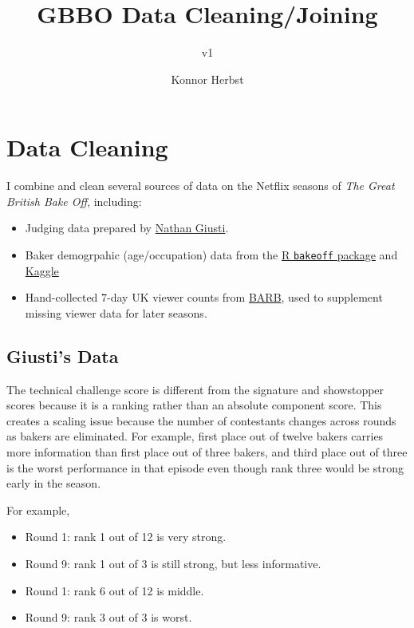 \documentclass[
  11pt,
  letterpaper,
  DIV=11,
  numbers=noendperiod]{scrartcl}
\title{GBBO Data Cleaning/Joining}
\subtitle{v1}
\author{Konnor Herbst}
\date{}
\renewcommand*\contentsname{Table of contents}
\newcommand\contentsname{Table of contents}
\begin{document}
\maketitle

\renewcommand*\contentsname{Table of contents}
{
\hypersetup{linkcolor=}
\setcounter{tocdepth}{7}
\tableofcontents
}

\newpage

\section{Data Cleaning}\label{data-cleaning}

I combine and clean several sources of data on the Netflix seasons of
\textit{The Great British Bake Off}, including:

\begin{itemize}
  \item Judging data prepared by \href{https://github.com/nathangiusti/BakeOff}{Nathan Giusti}.
  \item Baker demogrpahic (age/occupation) data from the
  \href{https://cran.r-project.org/web/packages/bakeoff/index.html}{R \texttt{bakeoff} package} and \href{https://www.kaggle.com/datasets/sarahvitvitskiy/great-british-bake-off-results-seasons-1-14}{Kaggle}
  \item Hand-collected 7-day UK viewer counts from
  \href{https://www.barb.co.uk/viewing-data/most-viewed-programmes/}{BARB},
  used to supplement missing viewer data for later seasons.
\end{itemize}

\subsection{Giusti's Data}\label{giustis-data}

The technical challenge score is different from the signature and
showstopper scores because it is a ranking rather than an absolute
component score. This creates a scaling issue because the number of
contestants changes across rounds as bakers are eliminated. For example,
first place out of twelve bakers carries more information than first
place out of three bakers, and third place out of three is the worst
performance in that episode even though rank three would be strong early
in the season.

For example,

\begin{itemize}
  \item Round 1: rank 1 out of 12 is very strong.
  \item Round 9: rank 1 out of 3 is still strong, but less informative.
  \item Round 1: rank 6 out of 12 is middle.
  \item Round 9: rank 3 out of 3 is worst.
\end{itemize}
\end{document}
